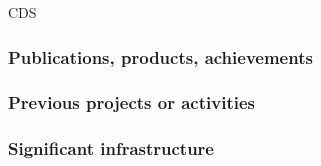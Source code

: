 \begin{sitedescription}{CDS}
\subsubsection*{Publications, products, achievements}

\begin{compactenum}
\item {}
\end{compactenum}

\subsubsection*{Previous projects or activities}

\begin{compactenum}
\item {}
\end{compactenum}

\subsubsection*{Significant infrastructure}

\end{sitedescription}

